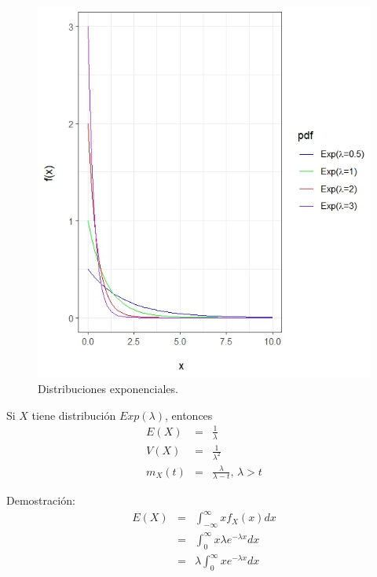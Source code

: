 \begin{i}
\begin{figure}[h!]
\centering
\includegraphics[scale=1]{Figuras/Exponenciales.jpeg}
\caption{Distribuciones exponenciales.}
\end{figure}


\begin{theorem}
 Si $X$ tiene distribución $Exp(\lambda)$, entonces
\begin{eqnarray*}
E(X) &=&\frac{1}{\lambda } \\
V(X) &=&\frac{1}{\lambda ^{2}} \\
m_{X}(t) &=&\frac{\lambda }{\lambda -t}\text{, }\lambda >t
\end{eqnarray*}
\end{theorem}

Demostración:
\begin{eqnarray*}
E(X) &=&\int_{-\infty }^{\infty }xf_{X}(x)dx \\
&=&\int_{0}^{\infty }x\lambda e^{-\lambda x}dx \\
&=&\lambda \int_{0}^{\infty }xe^{-\lambda x}dx
\end{eqnarray*}


\end{i}
